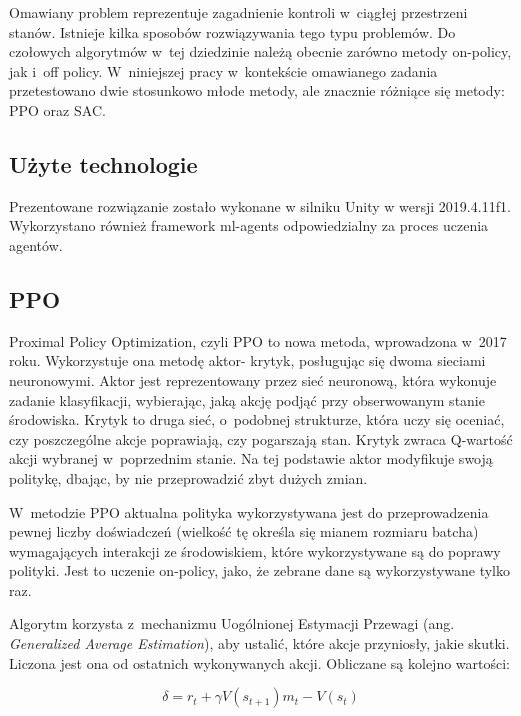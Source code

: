 \documentclass[a4paper,12pt]{article}
\begin{document}
Omawiany problem reprezentuje zagadnienie kontroli w~ciągłej przestrzeni stanów. Istnieje kilka sposobów rozwiązywania tego typu problemów. Do czołowych algorytmów w~tej dziedzinie należą obecnie zarówno metody on-policy, jak i~off policy. W~niniejszej pracy w~kontekście omawianego zadania przetestowano dwie stosunkowo młode metody, ale znacznie różniące się metody: PPO oraz SAC.


\subsection{Użyte technologie}
Prezentowane rozwiązanie zostało wykonane w silniku Unity w wersji 2019.4.11f1. Wykorzystano również framework ml-agents odpowiedzialny za proces uczenia agentów.

\subsection{PPO}
Proximal Policy Optimization, czyli PPO to nowa metoda, wprowadzona w~2017 roku. Wykorzystuje ona metodę aktor- krytyk, posługując się dwoma sieciami neuronowymi. Aktor jest reprezentowany przez sieć neuronową, która wykonuje zadanie klasyfikacji, wybierając, jaką akcję podjąć przy obserwowanym stanie środowiska. Krytyk to druga sieć, o~podobnej strukturze, która uczy się oceniać, czy poszczególne akcje poprawiają, czy pogarszają stan. Krytyk zwraca Q-wartość akcji wybranej w~poprzednim stanie. Na tej podstawie aktor modyfikuje swoją politykę, dbając, by nie przeprowadzić zbyt dużych zmian.

W~metodzie PPO aktualna polityka wykorzystywana jest do przeprowadzenia pewnej liczby doświadczeń (wielkość tę określa się mianem rozmiaru batcha) wymagających interakcji ze środowiskiem, które wykorzystywane są do poprawy polityki. Jest to uczenie on-policy, jako, że zebrane dane są wykorzystywane tylko raz.

Algorytm korzysta z~mechanizmu Uogólnionej Estymacji Przewagi (ang. \textit{Generalized Average Estimation}), aby ustalić, które akcje przyniosły, jakie skutki. Liczona jest ona od ostatnich wykonywanych akcji. Obliczane są kolejno wartości:

\begin{equation}
	\delta = r_t + \gamma V(s_{t+1})m_t - V(s_t)
\end{equation}
\end{document}
